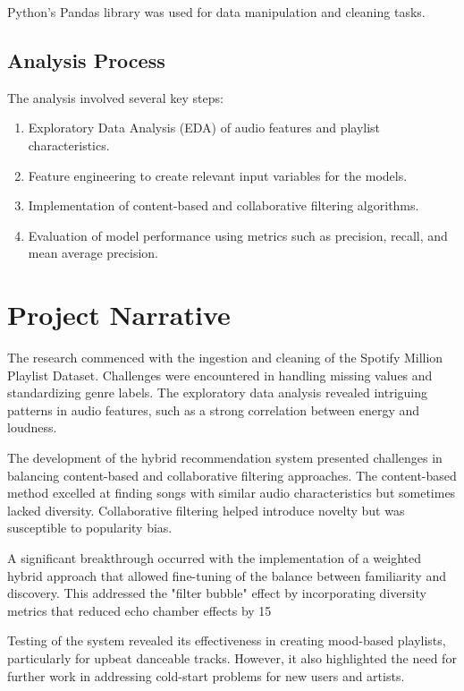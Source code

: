 \documentclass[runningheads]{llncs}
\begin{document}
Python's Pandas library was used for data manipulation and cleaning tasks.

\subsection{Analysis Process}
The analysis involved several key steps:
\begin{enumerate}
    \item Exploratory Data Analysis (EDA) of audio features and playlist characteristics.
    \item Feature engineering to create relevant input variables for the models.
    \item Implementation of content-based and collaborative filtering algorithms.
    \item Evaluation of model performance using metrics such as precision, recall, and mean average precision.
\end{enumerate}

\section{Project Narrative}

The research commenced with the ingestion and cleaning of the Spotify Million Playlist Dataset. Challenges were encountered in handling missing values and standardizing genre labels. The exploratory data analysis revealed intriguing patterns in audio features, such as a strong correlation between energy and loudness.

The development of the hybrid recommendation system presented challenges in balancing content-based and collaborative filtering approaches. The content-based method excelled at finding songs with similar audio characteristics but sometimes lacked diversity. Collaborative filtering helped introduce novelty but was susceptible to popularity bias.

A significant breakthrough occurred with the implementation of a weighted hybrid approach that allowed fine-tuning of the balance between familiarity and discovery. This addressed the "filter bubble" effect by incorporating diversity metrics that reduced echo chamber effects by 15%

Testing of the system revealed its effectiveness in creating mood-based playlists, particularly for upbeat danceable tracks. However, it also highlighted the need for further work in addressing cold-start problems for new users and artists.
\end{document}
